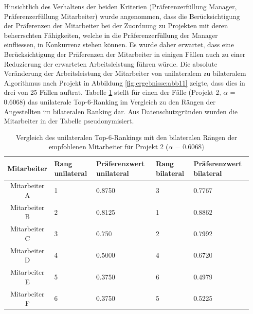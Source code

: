 Hinsichtlich des Verhaltens der beiden Kriterien (Präferenzerfüllung Manager, Präferenzerfüllung Mitarbeiter) wurde angenommen, dass die Berücksichtigung der Präferenzen der Mitarbeiter bei der Zuordnung zu Projekten mit deren beherrschten Fähigkeiten, welche in die Präferenzerfüllung der Manager einfliessen, in Konkurrenz stehen können.
Es wurde daher erwartet, dass eine Berücksichtigung der Präferenzen der Mitarbeiter in einigen Fällen auch zu einer Reduzierung der erwarteten Arbeitsleistung führen würde.
Die absolute Veränderung der Arbeitsleistung der Mitarbeiter von unilateralem zu bilateralem Algorithmus nach Projekt in Abbildung \ref{fig:ergebnisse:abb11} zeigte, dass dies in drei von 25 Fällen auftrat.
Tabelle \ref{tab:diskussion:tab2} stellt für einen der Fälle (Projekt 2, $\alpha$ = 0.6068) das unilaterale Top-6-Ranking im Vergleich zu den Rängen der Angestellten im bilateralen Ranking dar.
Aus Datenschutzgründen wurden die Mitarbeiter in der Tabelle pseudonymisiert.

\begin{table}[htbp]
    \begin{center}
    \begin{tabular}{c|p{0.7in}|p{0.95in}|p{0.7in}|p{0.95in}}
    {\textbf{Mitarbeiter}} & {\textbf{Rang unilateral}} & {\textbf{Präferenzwert unilateral}} & {\textbf{Rang bilateral}} & {\textbf{Präferenzwert bilateral}} \\
    \hline
	Mitarbeiter A & \hfil1 & \hfil0.8750 & \hfil3 & \hfil0.7767 \\
    \hline
    Mitarbeiter B & \hfil2 & \hfil0.8125 & \hfil1 & \hfil0.8862 \\
    \hline
	Mitarbeiter C & \hfil3 & \hfil0.750 & \hfil2 & \hfil0.7992 \\
    \hline
	Mitarbeiter D & \hfil4 & \hfil0.5000 & \hfil4 & \hfil0.6720 \\
    \hline
	Mitarbeiter E & \hfil5 & \hfil0.3750 & \hfil6 & \hfil0.4979 \\
    \hline
	Mitarbeiter F & \hfil6 & \hfil0.3750 & \hfil5 & \hfil0.5225 \\
    \end{tabular}
    \end{center}
    \caption[Vergleich des unilateralen Top-6-Rankings mit den bilateralen Rängen der empfohlenen Mitarbeiter für Projekt 2 ($\alpha$ = 0.6068)]{Vergleich des unilateralen Top-6-Rankings mit den bilateralen Rängen der empfohlenen Mitarbeiter für Projekt 2 ($\alpha$ = 0.6068)}
	\label{tab:diskussion:tab2}
\end{table}

